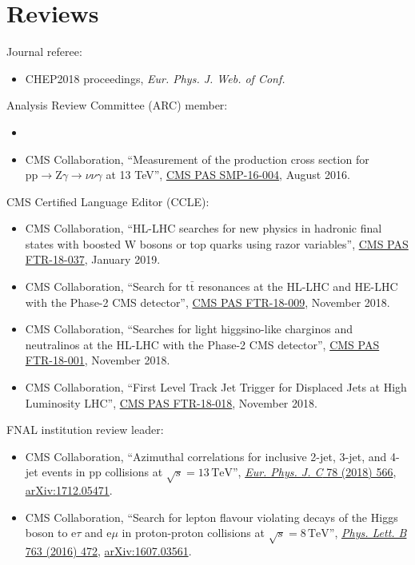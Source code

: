 \section{Reviews}
Journal referee:
\begin{itemize}[leftmargin=12pt]
\item CHEP2018 proceedings, \emph{Eur. Phys. J. Web. of Conf.}
\end{itemize}
Analysis Review Committee (ARC) member:
\begin{itemize}[leftmargin=12pt]
\item {}
\item CMS Collaboration, ``Measurement of the production cross section for $\text{p}\text{p} \to \text{Z}\gamma \to \nu\nu\gamma$ at 13 TeV'', \href{https://cds.cern.ch/record/2204922}{CMS PAS SMP-16-004}, August 2016.
\end{itemize}
CMS Certified Language Editor (CCLE):
\begin{itemize}[leftmargin=12pt]
\item CMS Collaboration, ``HL-LHC searches for new physics in hadronic final states with boosted W bosons or top quarks using razor variables'', \href{https://cds.cern.ch/record/2658262}{CMS PAS FTR-18-037}, January 2019.
\item CMS Collaboration, ``Search for $\text{t}\bar{\text{t}}$ resonances at the HL-LHC and HE-LHC with the Phase-2 CMS detector'', \href{https://cds.cern.ch/record/2649032}{CMS PAS FTR-18-009}, November 2018.
\item CMS Collaboration, ``Searches for light higgsino-like charginos and neutralinos at the HL-LHC with the Phase-2 CMS detector'', \href{https://cds.cern.ch/record/2648538}{CMS PAS FTR-18-001}, November 2018.
\item CMS Collaboration, ``First Level Track Jet Trigger for Displaced Jets at High Luminosity LHC'', \href{https://cds.cern.ch/record/2647987}{CMS PAS FTR-18-018}, November 2018.
\end{itemize}
FNAL institution review leader:
\begin{itemize}[leftmargin=12pt]
\item CMS Collaboration, ``Azimuthal correlations for inclusive 2-jet, 3-jet, and 4-jet events in pp collisions at $\sqrt{s} = 13\,\text{TeV}$'', \href{http://dx.doi.org/10.1140/epjc/s10052-018-6033-4}{\emph{Eur. Phys. J. C} 78 (2018) 566}, \href{http://arxiv.org/abs/1712.05471}{arXiv:1712.05471}.
\item CMS Collaboration, ``Search for lepton flavour violating decays of the Higgs boson to e$\tau$ and e$\mu$ in proton-proton collisions at $\sqrt{s} = 8\,\text{TeV}$'', \href{http://dx.doi.org/10.1016/j.physletb.2016.09.062}{\emph{Phys. Lett. B} 763 (2016) 472}, \href{http://arxiv.org/abs/1607.03561}{arXiv:1607.03561}.
\end{itemize}